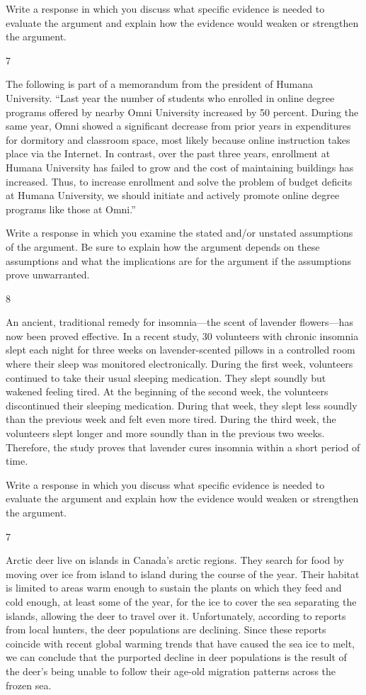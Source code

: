 \documentclass[]{article}
\begin{document}
Write a response in which you discuss what specific evidence is needed
to evaluate the argument and explain how the evidence would weaken or
strengthen the argument.

7

The following is part of a memorandum from the president of Humana
University. ``Last year the number of students who enrolled in online
degree programs offered by nearby Omni University increased by 50
percent. During the same year, Omni showed a significant decrease from
prior years in expenditures for dormitory and classroom space, most
likely because online instruction takes place via the Internet. In
contrast, over the past three years, enrollment at Humana University has
failed to grow and the cost of maintaining buildings has increased.
Thus, to increase enrollment and solve the problem of budget deficits at
Humana University, we should initiate and actively promote online degree
programs like those at Omni.''

Write a response in which you examine the stated and/or unstated
assumptions of the argument. Be sure to explain how the argument depends
on these assumptions and what the implications are for the argument if
the assumptions prove unwarranted.

8

An ancient, traditional remedy for insomnia---the scent of lavender
flowers---has now been proved effective. In a recent study, 30
volunteers with chronic insomnia slept each night for three weeks on
lavender-scented pillows in a controlled room where their sleep was
monitored electronically. During the first week, volunteers continued to
take their usual sleeping medication. They slept soundly but wakened
feeling tired. At the beginning of the second week, the volunteers
discontinued their sleeping medication. During that week, they slept
less soundly than the previous week and felt even more tired. During the
third week, the volunteers slept longer and more soundly than in the
previous two weeks. Therefore, the study proves that lavender cures
insomnia within a short period of time.

Write a response in which you discuss what specific evidence is needed
to evaluate the argument and explain how the evidence would weaken or
strengthen the argument.

7

Arctic deer live on islands in Canada's arctic regions. They search for
food by moving over ice from island to island during the course of the
year. Their habitat is limited to areas warm enough to sustain the
plants on which they feed and cold enough, at least some of the year,
for the ice to cover the sea separating the islands, allowing the deer
to travel over it. Unfortunately, according to reports from local
hunters, the deer populations are declining. Since these reports
coincide with recent global warming trends that have caused the sea ice
to melt, we can conclude that the purported decline in deer populations
is the result of the deer's being unable to follow their age-old
migration patterns across the frozen sea.
\end{document}
